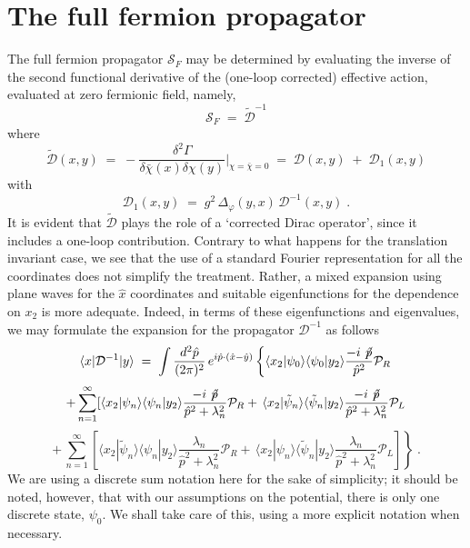 \documentclass[a4paper,12pt]{article}
\begin{document}
\section{The full fermion propagator}\label{sec:ferp}
The full fermion propagator ${\mathcal S}_F$ may be determined by
evaluating the inverse of the second functional derivative of the
(one-loop corrected) effective action, evaluated at zero fermionic
field, namely,
\begin{equation}
  \label{eq:fullprop}
{\mathcal S}_F \;=\; {\tilde{\mathcal D}}^{-1} 
\end{equation}
where
\begin{equation}
  \label{eq:fer2} 
{\tilde{\mathcal D}}(x,y)\;=\;-\frac{\delta^2\Gamma}{\delta{\bar\chi}(x)
\delta\chi(y)}|_{\chi={\bar\chi} =0}
\;=\;{\mathcal D}(x,y) \;+\; {\mathcal D}_1(x,y)
\end{equation}
with
\begin{equation}
{\mathcal D}_1(x,y)\;=\; g^2\,\Delta_\varphi (y,x)\, {\mathcal D}^{-1}(x,y) \;.         
\end{equation}
It is evident that ${\tilde{\mathcal D}}$ plays the role of a
`corrected Dirac operator', since it includes a one-loop contribution.
Contrary to what happens for the translation invariant case, we see
that the use of a standard Fourier representation for all the
coordinates does not simplify the treatment. Rather, a mixed expansion
using plane waves for the ${\hat x}$ coordinates and suitable
eigenfunctions for the dependence on $x_2$ is more adequate. Indeed,
in terms of these eigenfunctions and eigenvalues, we may formulate the
expansion for the propagator ${\mathcal D}^{-1}$ as follows
$$
\langle x|{\mathcal D}^{-1}|y\rangle\;=\; \int \frac{d^2{\hat
    p}}{(2\pi)^2} \,e^{i {\hat p}\cdot({\hat x}-{\hat y})} \left\{
  \langle x_2|\psi_0\rangle \langle\psi_0|y_2\rangle \frac{-i \not \!
    {\hat p}}{{\hat p}^2}{\mathcal P}_R \right.
$$
$$
+\sum_{n=1}^\infty [\langle
x_2|\psi_n\rangle\langle\psi_n|y_2\rangle \frac{-i \not \! {\hat
    p}}{{\hat p}^2+\lambda_n^2}{\mathcal P}_R +\,\langle x_2|{\tilde
  \psi}_n\rangle \langle{\tilde \psi}_n|y_2\rangle \frac{-i \not \!
  {\hat p}}{{\hat p}^2+\lambda_n^2} {\mathcal P}_L
$$
\begin{equation}
  \label{eq:ferexp}
\left. +\,\sum_{n=1}^\infty [\langle x_2|{\tilde \psi}_n\rangle
\langle\psi_n|y_2\rangle \frac{\lambda_n}{{\hat p}^2+\lambda_n^2} 
{\mathcal P}_R +\,\langle x_2|\psi_n\rangle \langle{\tilde \psi}_n|y_2\rangle 
\frac{\lambda_n}{{\hat p}^2+\lambda_n^2} 
{\mathcal P}_L ] \right\} \;.
\end{equation}
We are using a discrete sum notation here for the sake of simplicity;
it should be noted, however, that with our assumptions on the potential,
there is only one discrete state, $\psi_0$. We shall take care of this,
using a more explicit notation when necessary.
\end{document}
